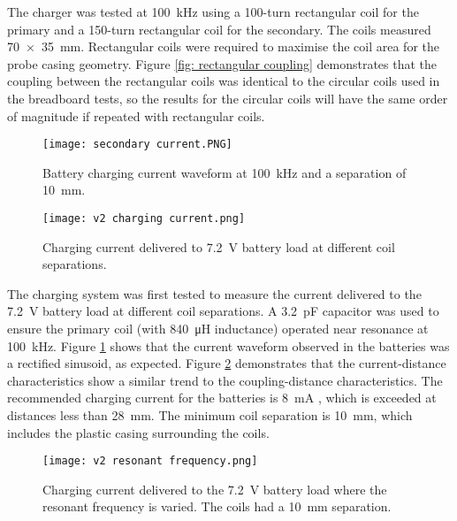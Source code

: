 The charger was tested at \SI{100}{\kilo\hertz} using a 100-turn rectangular coil for the primary and a 150-turn rectangular coil for the secondary. The coils measured \SI{70 x 35}{\milli\metre}. Rectangular coils were required to maximise the coil area for the probe casing geometry. Figure \ref{fig: rectangular coupling} demonstrates that the coupling between the rectangular coils was identical to the circular coils used in the breadboard tests, so the results for the circular coils will have the same order of magnitude if repeated with rectangular coils.\\


\begin{figure}[htb]
	\centering
	\texttt{[image: secondary current.PNG]}
	\caption{Battery charging current waveform at \SI{100}{\kilo\hertz} and a separation of \SI{10}{\milli\metre}.}
	\label{fig: secondary current}
\end{figure}



\begin{figure}[htb]
	\centering
	\texttt{[image: v2 charging current.png]}
	\caption{Charging current delivered to \SI{7.2}{\volt} battery load at different coil separations.}
	\label{fig: current distance}
\end{figure}

The charging system was first tested to measure the current delivered to the \SI{7.2}{\volt} battery load at different coil separations. A \SI{3.2}{\pico\farad} capacitor was used to ensure the primary coil (with \SI{840}{\micro\henry} inductance) operated near resonance at \SI{100}{\kilo\hertz}. Figure \ref{fig: secondary current} shows that the current waveform observed in the batteries was a rectified sinusoid, as expected. Figure \ref{fig: current distance} demonstrates that the current-distance characteristics show a similar trend to the coupling-distance characteristics. The recommended charging current for the batteries is \SI{8}{\milli\ampere} \cite{rs_pro_batteries}, which is exceeded at distances less than \SI{28}{\milli\metre}. The minimum coil separation is \SI{10}{\milli\metre}, which includes the plastic casing surrounding the coils.\\

\begin{figure}[htb]
	\centering
	\texttt{[image: v2 resonant frequency.png]}
	\caption{Charging current delivered to the \SI{7.2}{\volt} battery load where the resonant frequency is varied. The coils had a \SI{10}{\milli\metre} separation.}
	\label{fig: current resonance}
\end{figure}

